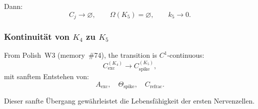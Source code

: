 Dann:
\[
  C_j \to \varnothing,
\qquad
  \Omega(K_5)=\varnothing,
\qquad
  k_5\to 0.
\]

\subsubsection{Kontinuität von \texorpdfstring{$K_4$}{K_4} zu \texorpdfstring{$K_5$}{K_5}}

From Polish~W3 (memory~\#74), the transition is $C^1$-continuous:
\[
  C_{\mathrm{exc}}^{(K_4)}
   \longrightarrow
  C_{\mathrm{spike}}^{(K_5)},
\]
mit sanftem Entstehen von:
\[
  A_{\mathrm{exc}},\quad
  \Theta_{\mathrm{spike}},\quad
  C_{\mathrm{refrac}}.
\]

Dieser sanfte Übergang gewährleistet die Lebensfähigkeit der ersten Nervenzellen.

